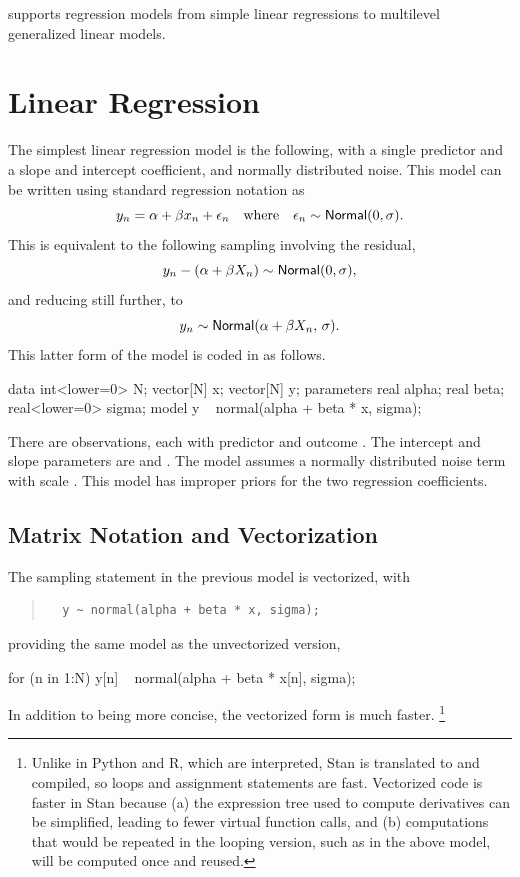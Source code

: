 \noindent
\Stan supports regression models from simple linear regressions to
multilevel generalized linear models.  

\section{Linear Regression}

The simplest linear regression model is the following, with a single
predictor and a slope and intercept coefficient, and normally
distributed noise.  This model can be written using standard
regression notation as
%
\[
y_n = \alpha + \beta x_n + \epsilon_n
\ \ \ \mbox{where} \ \ \ 
\epsilon_n \sim \distro{Normal}(0,\sigma).
\]
This is equivalent to the following sampling involving the
residual,
\[
y_n - (\alpha + \beta X_n) \sim \distro{Normal}(0,\sigma),
\]
and reducing still further, to
\[
y_n \sim \distro{Normal}(\alpha + \beta X_n, \, \sigma).
\]
%
This latter form of the model is coded in \Stan as follows.
%
\begin{stancode}
data {
  int<lower=0> N;
  vector[N] x;
  vector[N] y;
}
parameters {
  real alpha;
  real beta;
  real<lower=0> sigma;
}
model {
  y ~ normal(alpha + beta * x, sigma);
}
\end{stancode}
%
There are  observations, each with predictor  and
outcome \code{y[n]}.  The intercept and slope parameters are
 and .  The model assumes a normally
distributed noise term with scale .  This model has
improper priors for the two regression coefficients.

\subsection{Matrix Notation and Vectorization}

The sampling statement in the previous model is vectorized, with
%
\begin{quote}
\begin{Verbatim}
  y ~ normal(alpha + beta * x, sigma);
\end{Verbatim}
\end{quote}
%
providing the same model as the unvectorized version,
%
\begin{stancode}
  for (n in 1:N)
    y[n] ~ normal(alpha + beta * x[n], sigma);
\end{stancode}
%
In addition to being more concise, the vectorized form is much faster.%
%
\footnote{Unlike in Python and R, which are interpreted, Stan is
  translated to \Cpp and compiled, so loops and assignment statements
  are fast.  Vectorized code is faster in Stan because (a) the
  expression tree used to compute derivatives can be simplified,
  leading to fewer virtual function calls, and (b) computations that
  would be repeated in the looping version, such as \code{log(sigma)}
  in the above model, will be computed once and reused.}

